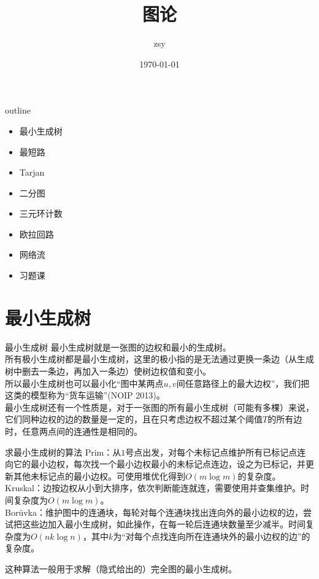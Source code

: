 \documentclass{beamer}
\title{图论}
\date{\today}
\author{zsy}
\begin{document}
\small
	
\begin{frame}
	\titlepage
\end{frame}

\begin{frame}{outline}
	\begin{itemize}
		\item 最小生成树
		\item 最短路
		\item Tarjan
		\item 二分图
		\item 三元环计数
		\item 欧拉回路
		\item 网络流
		\item 习题课
	\end{itemize}
\end{frame}

\section{最小生成树}
\begin{frame}{最小生成树}
	最小生成树就是一张图的边权和最小的生成树。\\
	
	所有极小生成树都是最小生成树，这里的极小指的是无法通过更换一条边（从生成树中删去一条边，再加入一条边）使树边权值和变小。\\
	
	所以最小生成树也可以最小化“图中某两点$u, v$间任意路径上的最大边权”，我们把这类的模型称为“货车运输”(NOIP 2013)。\\
	
	最小生成树还有一个性质是，对于一张图的所有最小生成树（可能有多棵）来说，它们同种边权的边的数量是一定的，且在只考虑边权不超过某个阈值$T$的所有边时，任意两点间的连通性是相同的。
\end{frame}

\begin{frame}{求最小生成树的算法}
	Prim：从$1$号点出发，对每个未标记点维护所有已标记点连向它的最小边权，每次找一个最小边权最小的未标记点连边，设之为已标记，并更新其他未标记点的最小边权。可使用堆优化得到$O(m\log m)$的复杂度。\\
	
	Kruskal：边按边权从小到大排序，依次判断能连就连，需要使用并查集维护。时间复杂度为$O(m\log m)$。\\
	
	Borüvka：维护图中的连通块，每轮对每个连通块找出连向外的最小边权的边，尝试把这些边加入最小生成树，如此操作，在每一轮后连通块数量至少减半。时间复杂度为$O(nk\log n)$，其中$k$为“对每个点找连向所在连通块外的最小边权的边”的复杂度。
	
	这种算法一般用于求解（隐式给出的）完全图的最小生成树。
\end{frame}
\end{document}
